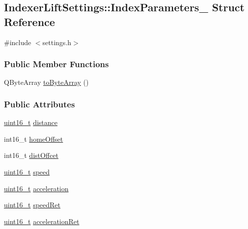 \hypertarget{structIndexerLiftSettings_1_1IndexParameters__}{}\subsection{Indexer\+Lift\+Settings\+:\+:Index\+Parameters\+\_\+ Struct Reference}
\label{structIndexerLiftSettings_1_1IndexParameters__}


{\ttfamily \#include $<$settings.\+h$>$}

\subsubsection*{Public Member Functions}
\begin{DoxyCompactItemize}
\item 
Q\+Byte\+Array \mbox{\hyperlink{structIndexerLiftSettings_1_1IndexParameters___a2ed5d38af73aae6fe65d2e0d928eb42a}{to\+Byte\+Array}} ()
\end{DoxyCompactItemize}
\subsubsection*{Public Attributes}
\begin{DoxyCompactItemize}
\item 
\mbox{\hyperlink{settings_8h_a017dd44e68049ffdd31500a8cd01ba68}{uint16\+\_\+t}} \mbox{\hyperlink{structIndexerLiftSettings_1_1IndexParameters___acf98dbf8129022be81355dc1e4a70203}{distance}}
\item 
int16\+\_\+t \mbox{\hyperlink{structIndexerLiftSettings_1_1IndexParameters___ad9ab7cc5780480b481d54e03102e5f79}{home\+Offset}}
\item 
int16\+\_\+t \mbox{\hyperlink{structIndexerLiftSettings_1_1IndexParameters___adfe603b56a3ef4624bb59390a08c19cf}{dist\+Offcet}}
\item 
\mbox{\hyperlink{settings_8h_a017dd44e68049ffdd31500a8cd01ba68}{uint16\+\_\+t}} \mbox{\hyperlink{structIndexerLiftSettings_1_1IndexParameters___a7cff4645b11fbdf47e73e7faadf8bc9f}{speed}}
\item 
\mbox{\hyperlink{settings_8h_a017dd44e68049ffdd31500a8cd01ba68}{uint16\+\_\+t}} \mbox{\hyperlink{structIndexerLiftSettings_1_1IndexParameters___adb7016a7d40f054ae4d534e6d7a3ad9e}{acceleration}}
\item 
\mbox{\hyperlink{settings_8h_a017dd44e68049ffdd31500a8cd01ba68}{uint16\+\_\+t}} \mbox{\hyperlink{structIndexerLiftSettings_1_1IndexParameters___af2b7b9756b272b7b60023be484749dad}{speed\+Ret}}
\item 
\mbox{\hyperlink{settings_8h_a017dd44e68049ffdd31500a8cd01ba68}{uint16\+\_\+t}} \mbox{\hyperlink{structIndexerLiftSettings_1_1IndexParameters___a8a602a3ffc41e9ab7d7979a260110427}{acceleration\+Ret}}
\end{DoxyCompactItemize}


